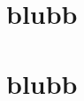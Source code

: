 \documentclass[parskip=full,ngerman]{scrreprt}%
\begin{document}
\begin{figure}
  \begin{center}
  \end{center}
\end{figure}

\chapter{blubb}
\chapter{blubb}%
\end{document}
